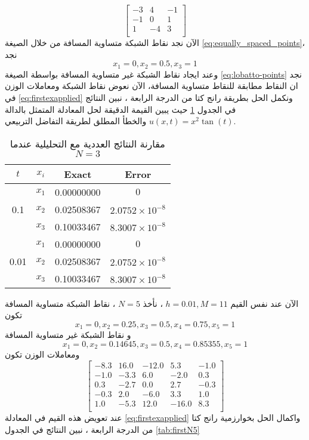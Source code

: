\begin{example}
\[\begin{bmatrix}
	-3 & 4 & -1 \\
	-1 & 0 & 1 \\
	1 & -4 & 3 \\
\end{bmatrix}
 	\]
 	الآن نجد نقاط الشبكة متساوية المسافة من خلال الصيغة \eqref{eq:equally_spaced_points}، نجد
 	\[
 	x_1 = 0, x_2 = 0.5, x_3 = 1
 	\]
 	وعند ايجاد نقاط الشبكة غير متساوية المسافة بواسطة الصيغة \eqref{eq:lobatto-points} نجد ان النقاط مطابقة للنقاط متساوية المسافة، الآن نعوض نقاط الشبكة ومعاملات الوزن في \eqref{eq:firstexapplied} ونكمل الحل بطريقة رانج كتا من الدرجة الرابعة ، نبين النتائج في الجدول \ref{tab:firstN3} حيث يبين القيمة الدقيقة لحل المعادلة المتمثل بالدالة
 	 $u(x, t) = x^2 \tan(t)$ والخطأ المطلق لطريقة التفاضل التربيعي.
\begin{table}[H]
	\centering
	\renewcommand{\arraystretch}{1.5}
	\begin{english}
		\begin{tabular}{|c|c|c|c|}
			\hline
			$t$ & $x_i$ & Exact & Error\\
			\hline
			\multirow{3}{*}{0.1}  & $x_1$ & 0.00000000  & $0$ \\
			& $x_2$ & 0.02508367  & $2.0752\times10^{-8}$ \\
			& $x_3$ & 0.10033467  & $8.3007\times10^{-8}$ \\
			\hline
			\multirow{3}{*}{0.01} & $x_1$ & 0.00000000  & $0$ \\
			& $x_2$ & 0.02508367  & $2.0752\times10^{-8}$ \\
			& $x_3$ & 0.10033467  & $8.3007\times10^{-8}$ \\
			\hline
		\end{tabular}
	\end{english}
	\caption{مقارنة النتائج العددية مع التحليلية عندما $N=3$}
		\label{tab:firstN3}
\end{table}
الآن عند نفس القيم $h=0.01, M=11 $ ، نأخذ $N=5$ ، نقاط الشبكة متساوية المسافة تكون
\[
x_1 = 0, x_2 =0.25, x_3 = 0.5 , x_4=0.75, x_5 =1
\]
و نقاط الشبكة غير متساوية المسافة
\[
           x_1= 0,x_2=      0.14645   ,  x_3=     0.5, x_4=      0.85355   , x_5=   1
\]
ومعاملات الوزن تكون
\[
\begin{bmatrix}
	-8.3 & 16.0 & -12.0 & 5.3 & -1.0 \\
	-1.0 & -3.3 & 6.0 & -2.0 & 0.3 \\
	0.3 & -2.7 & 0.0 & 2.7 & -0.3 \\
	-0.3 & 2.0 & -6.0 & 3.3 & 1.0 \\
	1.0 & -5.3 & 12.0 & -16.0 & 8.3 \\
\end{bmatrix}
\]
عند تعويض هذه القيم في المعادلة \eqref{eq:firstexapplied} واكمال الحل بخوارزمية رانج كتا من الدرجة الرابعة ، نبين النتائج في الجدول \ref{tab:firstN5} 
	

\end{example}
